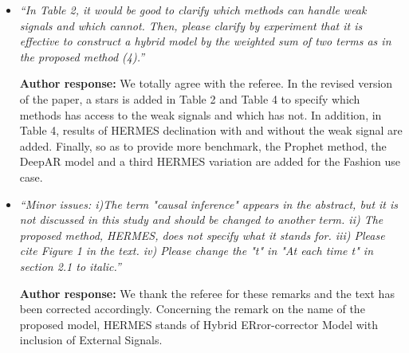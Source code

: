 \documentclass[10pt]{article} %
\begin{document}
\begin{itemize}
	\item {\em ``In Table 2, it would be good to clarify which methods can handle weak signals and which cannot. Then, please clarify by experiment that it is effective to construct a hybrid model by the weighted sum of two terms as in the proposed method (4).''} \medskip

	\textbf{Author response:} We totally agree with the referee. In the revised version of the paper, a stars is added in Table 2 and Table 4 to specify which methods has access to the weak signals and which has not. In addition, in Table 4, results of HERMES declination with and without the weak signal are added. Finally, so as to provide more benchmark, the Prophet method, the DeepAR model and a third HERMES variation are added for the Fashion use case.\\
	
	\item {\em ``Minor issues: i)The term "causal inference" appears in the abstract, but it is not discussed in this study and should be changed to another term. ii) The proposed method, HERMES, does not specify what it stands for. iii) Please cite Figure 1 in the text. iv) Please change the "t" in "At each time t" in section 2.1 to italic.''} \medskip

	\textbf{Author response:} We thank the referee for these remarks and the text has been corrected accordingly. Concerning the remark on the name of the proposed model, HERMES stands of Hybrid ERror-corrector Model with inclusion of External Signals.\\	
\end{itemize}
\end{document}
